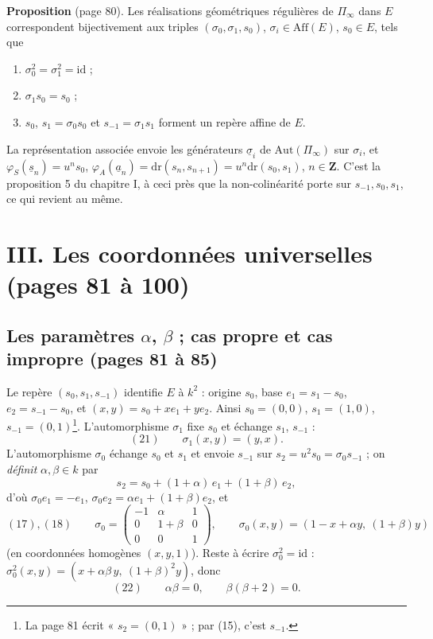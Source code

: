 \documentclass[11pt,a4paper]{article}
\begin{document}
\textbf{Proposition} (page 80). Les réalisations géométriques régulières de
$\Pi_\infty$ dans $E$ correspondent bijectivement aux triples $(\sigma_0,
\sigma_1, s_0)$, $\sigma_i \in \mathrm{Aff}(E)$, $s_0 \in E$, tels que
\begin{enumerate}
  \item[a)] $\sigma_0^2 = \sigma_1^2 = \mathrm{id}$ ;
  \item[b)] $\sigma_1 s_0 = s_0$ ;
  \item[c)] $s_0$, $s_1 = \sigma_0 s_0$ et $s_{-1} = \sigma_1 s_1$ forment un
    repère affine de $E$.
\end{enumerate}
La représentation associée envoie les générateurs $\underline{\sigma}_i$ de
$\mathrm{Aut}(\Pi_\infty)$ sur $\sigma_i$, et $\varphi_S(\underline{s}_n) = u^n
s_0$, $\varphi_A(\underline{a}_n) = \mathrm{dr}(s_n, s_{n+1}) = u^n
\mathrm{dr}(s_0, s_1)$, $n \in \mathbf{Z}$. C'est la proposition 5 du
chapitre I, à ceci près que la non-colinéarité porte sur $s_{-1}, s_0, s_1$, ce
qui revient au même.

\section*{III. Les coordonnées universelles (pages 81 à 100)}

\subsection*{Les paramètres $\alpha$, $\beta$ ; cas propre et cas impropre (pages 81 à 85)}

Le repère $(s_0, s_1, s_{-1})$ identifie $E$ à $k^2$ : origine $s_0$, base
$e_1 = s_1 - s_0$, $e_2 = s_{-1} - s_0$, et $(x, y) = s_0 + x e_1 + y e_2$.
Ainsi $s_0 = (0,0)$, $s_1 = (1, 0)$, $s_{-1} = (0, 1)$\footnote{La page 81
écrit « $s_2 = (0,1)$ » ; par (15), c'est $s_{-1}$.}. L'automorphisme
$\sigma_1$ fixe $s_0$ et échange $s_1$, $s_{-1}$ :
\[
  (21) \qquad \sigma_1(x, y) = (y, x) .
\]
L'automorphisme $\sigma_0$ échange $s_0$ et $s_1$ et envoie $s_{-1}$ sur $s_2 =
u^2 s_0 = \sigma_0 s_{-1}$ ; on \emph{définit} $\alpha, \beta \in k$ par
\[
  s_2 = s_0 + (1 + \alpha)\, e_1 + (1 + \beta)\, e_2 ,
\]
d'où $\sigma_0 e_1 = -e_1$, $\sigma_0 e_2 = \alpha e_1 + (1 + \beta) e_2$, et
\[
  (17), (18) \qquad \sigma_0 = \begin{pmatrix} -1 & \alpha & 1 \\ 0 & 1 + \beta
  & 0 \\ 0 & 0 & 1 \end{pmatrix}, \qquad \sigma_0(x, y) = (1 - x + \alpha y,\
  (1 + \beta) y)
\]
(en coordonnées homogènes $(x, y, 1)$). Reste à écrire $\sigma_0^2 =
\mathrm{id}$ : $\sigma_0^2(x, y) = (x + \alpha\beta\, y,\ (1 + \beta)^2 y)$,
donc
\[
  (22) \qquad \alpha\beta = 0, \qquad \beta(\beta + 2) = 0 .
\]
\end{document}
